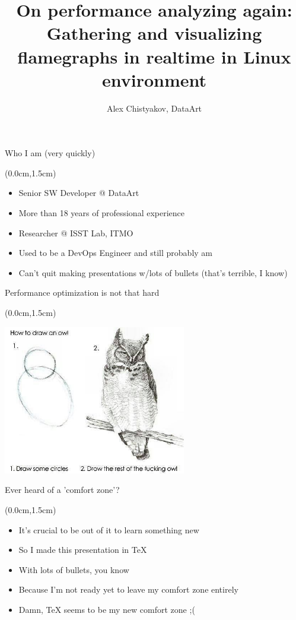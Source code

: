 \documentclass[xetex,14pt,aspectratio=169]{beamer}
\title[Gathering and visualizing flamegraphs in realtime]{On performance analyzing again:\\ {Gathering and visualizing flamegraphs in realtime in Linux environment}}
\author[Alex Chistyakov, DataArt]{Alex Chistyakov, DataArt}
\institute[]{Linux Piter 2016, Russia, SPb.}
\date{}
\begin{document}
\setlength{\fboxsep}{0pt}

\begin{frame}
  \titlepage
\end{frame}

\begin{frame}{Who I am (very quickly)}
\begin{textblock*}{\framewidth-0.8cm}(0.0cm,1.5cm) %
\begin{itemize}
  \item Senior SW Developer @ DataArt
  \item More than 18 years of professional experience
  \item Researcher @ ISST Lab, ITMO
  \item Used to be a DevOps Engineer and still probably am
  \item Can't quit making presentations w/lots of bullets (that's terrible, I know)
\end{itemize}
\end{textblock*}
\end{frame}

\begin{frame}{Performance optimization is not that hard}
\begin{textblock*}{\framewidth-0.8cm}(0.0cm,1.5cm) %
\begin{minipage}{\textwidth}
  \centering
  \includegraphics[width=8cm]{img/owl}
\end{minipage}
\end{textblock*}
\end{frame}

\begin{frame}{Ever heard of a 'comfort zone'?}
\begin{textblock*}{\framewidth-0.8cm}(0.0cm,1.5cm) %
\begin{itemize}
  \item It's crucial to be out of it to learn something new
  \item So I made this presentation in TeX
  \item With lots of bullets, you know
  \item Because I'm not ready yet to leave my comfort zone entirely
  \item Damn, TeX seems to be my new comfort zone ;(
\end{itemize}
\end{textblock*}
\end{frame}
\end{document}

